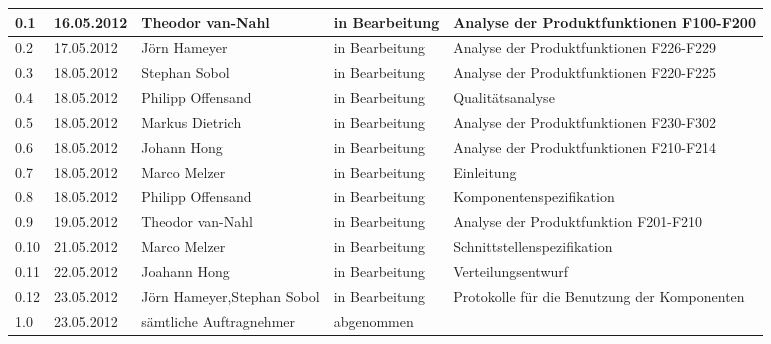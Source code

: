 \begin{longtable}{|m{1.78cm}|m{1.59cm}|m{2.86cm}|m{1.9cm}|m{5.25cm}|}
  0.1   &    16.05.2012    &    Theodor van-Nahl    &   in Bearbeitung     &    Analyse der Produktfunktionen F100-F200\\       %
  \hline                                              %
  0.2   &    17.05.2012    &    Jörn Hameyer    &   in Bearbeitung     &    Analyse der Produktfunktionen F226-F229\\       %
  \hline
  0.3   &    18.05.2012    &    Stephan Sobol    &   in Bearbeitung     &    Analyse der Produktfunktionen F220-F225\\       %
  \hline
  0.4   &    18.05.2012    &    Philipp \mbox{Offensand}    &   in Bearbeitung     &    Qualitätsanalyse\\       %
  \hline
  0.5   &    18.05.2012    &    Markus Dietrich    &   in Bearbeitung     &    Analyse der Produktfunktionen F230-F302\\       %
  \hline
  0.6   &    18.05.2012    &    Johann Hong    &   in Bearbeitung     &    Analyse der Produktfunktionen F210-F214\\       %
  \hline
  0.7   &    18.05.2012    &    Marco Melzer    &   in Bearbeitung     &    Einleitung\\       %
  \hline
  0.8   &    18.05.2012    &    Philipp \mbox{Offensand}    &   in Bearbeitung     &    Komponentenspezifikation\\       %
  \hline
  0.9   &    19.05.2012    &    Theodor van-Nahl    &   in Bearbeitung     &    Analyse der Produktfunktion F201-F210\\       %
  \hline
  0.10   &   21.05.2012    &    Marco Melzer    &   in Bearbeitung     &    Schnittstellenspezifikation\\       %
  \hline
  0.11   &   22.05.2012    &    Joahann Hong    &   in Bearbeitung     &    Verteilungsentwurf\\       %
  \hline
  0.12   &   23.05.2012    &    Jörn Hameyer,\newline Stephan Sobol    &   in Bearbeitung     &    Protokolle für die Benutzung der Komponenten\\       %
  \hline
  1.0   &    23.05.2012    &    sämtliche Auftragnehmer    &   abgenommen     &    \\       %
  \hline
  

\end{longtable}

